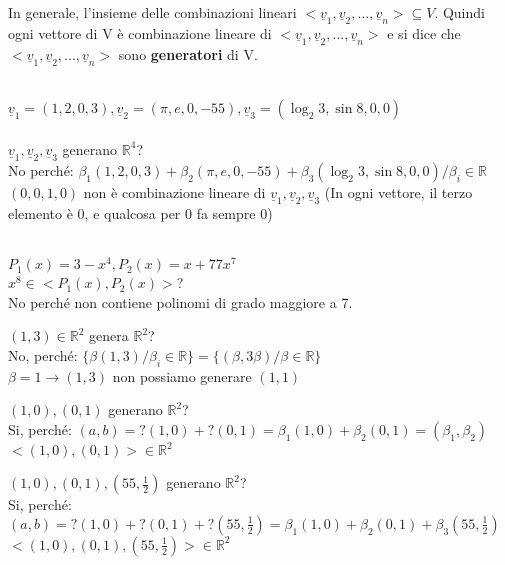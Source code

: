   \leavevmode\\
  In generale, l'insieme delle combinazioni lineari
  $<\underline{v}_{1},\underline{v}_{2},...,\underline{v}_{n}>\subseteq
  V$. Quindi ogni vettore di V è combinazione lineare di
  $<\underline{v}_{1},\underline{v}_{2},...,\underline{v}_{n}>$ e si
  dice che
  $<\underline{v}_{1},\underline{v}_{2},...,\underline{v}_{n}>$ sono
  \textbf{generatori} di V.
  \begin{es}
    \phantom{}\\
    $\underline{v}_1=(1,2,0,3), \underline{v}_2=(\pi,e,0,-55),
    \underline{v}_3=(\log_2 3,\sin 8,0,0)$\\\\
    $\underline{v}_1, \underline{v}_2, \underline{v}_3$ generano
    $\mathbb{R}^4$?\\
    No perché: $\beta_1(1,2,0,3)+\beta_2(\pi,e,0,-55)+\beta_3(\log_2
    3,\sin 8,0,0)/\beta_i\in\mathbb{R}$\\
    $(0,0,1,0)$ non è combinazione lineare di
    $\underline{v}_1,\underline{v}_2,\underline{v}_3$ (In ogni
    vettore, il terzo elemento è 0, e qualcosa per 0 fa sempre 0)\\\\
  \end{es}
  \begin{es}
    $P_1(x)=3-x^4, P_2(x)=x+77x^7$\\
    $x^8\in<P_1(x), P_2(x)>$?\\
    No perché non contiene polinomi di grado maggiore a 7.
  \end{es}
  \begin{es}
    $(1,3)\in\mathbb{R}^2$ genera $\mathbb{R}^2$?\\
    No, perché:
    $\{\beta(1,3)/\beta_i\in\mathbb{R}\}=\{(\beta,3\beta)/\beta\in\mathbb{R}\}$\\
    $\beta=1\rightarrow(1,3)$ non possiamo generare $(1,1)$
  \end{es}
  \begin{es}
    $(1,0),(0,1)$ generano $\mathbb{R}^2$?\\
    Si, perché:
    $(a,b)=?(1,0)+?(0,1)=\beta_1(1,0)+\beta_2(0,1)=(\beta_1,\beta_2)$\\
    $<(1,0),(0,1)>\in\mathbb{R}^2$
  \end{es}
  \begin{es}
    $(1,0),(0,1),(55,\frac{1}{2})$ generano $\mathbb{R}^2$?\\
    Si, perché:
    $(a,b)=?(1,0)+?(0,1)+?(55,\frac{1}{2})=\beta_1(1,0)+\beta_2(0,1)+\beta_3(55,\frac{1}{2})$\\
    $<(1,0),(0,1),(55,\frac{1}{2})>\in\mathbb{R}^2$
  \end{es}

